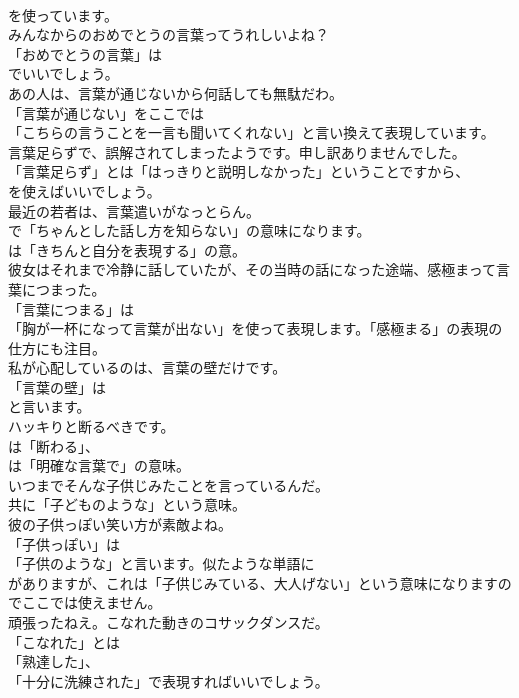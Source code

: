 \documentclass[8pt]{extreport}
\begin{document}
\begin{CJK}{UTF8}{min}
\\	を使っています。	
\\	みんなからのおめでとうの言葉ってうれしいよね？ 
\\	「おめでとうの言葉」は
\\	でいいでしょう。	
\\	あの人は、言葉が通じないから何話しても無駄だわ。 
\\	「言葉が通じない」をここでは
\\	「こちらの言うことを一言も聞いてくれない」と言い換えて表現しています。	
\\	言葉足らずで、誤解されてしまったようです。申し訳ありませんでした。 
\\	「言葉足らず」とは「はっきりと説明しなかった」ということですから、
\\	を使えばいいでしょう。	
\\	最近の若者は、言葉遣いがなっとらん。 
\\	で「ちゃんとした話し方を知らない」の意味になります。
\\	は「きちんと自分を表現する」の意。	
\\	彼女はそれまで冷静に話していたが、その当時の話になった途端、感極まって言葉につまった。 
\\	「言葉につまる」は
\\	「胸が一杯になって言葉が出ない」を使って表現します。「感極まる」の表現の仕方にも注目。	
\\	私が心配しているのは、言葉の壁だけです。 
\\	「言葉の壁」は
\\	と言います。	
\\	ハッキりと断るべきです。 
\\	は「断わる」、
\\	は「明確な言葉で」の意味。	
\\	いつまでそんな子供じみたことを言っているんだ。 
\\	共に「子どものような」という意味。	
\\	彼の子供っぽい笑い方が素敵よね。 
\\	「子供っぽい」は
\\	「子供のような」と言います。似たような単語に
\\	がありますが、これは「子供じみている、大人げない」という意味になりますのでここでは使えません。	
\\	頑張ったねえ。こなれた動きのコサックダンスだ。 
\\	「こなれた」とは
\\	「熟達した」、
\\	「十分に洗練された」で表現すればいいでしょう。	

\end{CJK}
\end{document}
